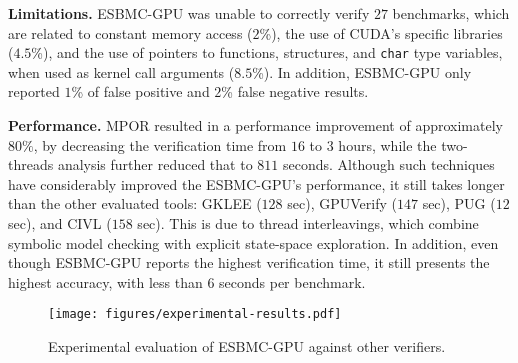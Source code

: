 \documentclass{llncs}
\begin{document}
{\bf Limitations.} ESBMC-GPU was unable to correctly verify $27$ benchmarks, which are related to constant memory access ($2$\%), the use of CUDA's specific libraries ($4.5$\%), and the use of pointers to functions, structures, and {\tt char} type variables, when used as kernel call arguments ($8.5$\%). In addition, ESBMC-GPU only reported $1$\% of false positive and $2$\% false negative results.


{\bf Performance.} MPOR resulted in a performance improvement of approximately $80\%$, by decreasing the verification time from $16$ to $3$ hours, while the two-threads analysis further reduced that to $811$ seconds. Although such techniques have considerably improved the ESBMC-GPU's performance, it still takes longer than the other evaluated tools:  GKLEE ($128$ sec), GPUVerify ($147$ sec), PUG ($12$ sec), and CIVL ($158$ sec). This is due to thread interleavings, which combine symbolic model checking with explicit state-space exploration. In addition, even though ESBMC-GPU reports the highest verification time, it still presents the highest accuracy, with less than $6$ seconds per benchmark.%



\begin{figure}[htb]
  \centering
  \texttt{[image: figures/experimental-results.pdf]}
  \caption{Experimental evaluation of ESBMC-GPU against other verifiers.}
  \label{figure:experimental}
\end{figure}
\end{document}

